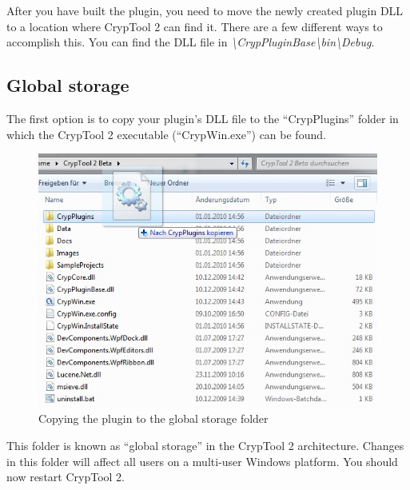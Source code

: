 After you have built the plugin, you need to move the newly created plugin DLL to a location where CrypTool 2 can find it. There are a few different ways to accomplish this. You can find the DLL file in \textit{\textbackslash CrypPluginBase\textbackslash bin\textbackslash Debug}.

\subsection{Global storage}
\label{sec:GlobalStorage}

The first option is to copy your plugin's DLL file to the ``CrypPlugins'' folder in which the CrypTool 2 executable (``CrypWin.exe'') can be found. %

\begin{figure}[h]
	\centering
		\includegraphics{figures/copy_dll_global_storage.jpg}
	\caption{Copying the plugin to the global storage folder}
	\label{fig:copy_dll_global_storage}
\end{figure}

This folder is known as ``global storage'' in the CrypTool 2 architecture. Changes in this folder will affect all users on a multi-user Windows platform. You should now restart CrypTool 2.
\clearpage

